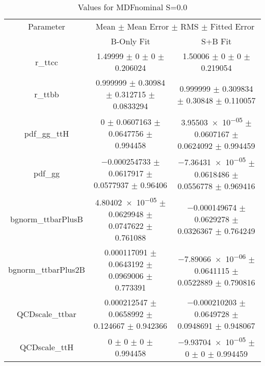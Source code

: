 \begin{table}
\centering
\caption{Values for MDFnominal S=0.0}
\begin{tabular}{ccc}
\toprule
Parameter & \multicolumn{2}{c}{Mean $\pm$ Mean Error $\pm$ RMS $\pm$ Fitted Error}\\
 & B-Only Fit & S+B Fit\\
\midrule
r\_ttcc & \num{1.49999} $\pm$ \num{0} $\pm$ \num{0} $\pm$ \num{0.206024} & \num{1.50006} $\pm$ \num{0} $\pm$ \num{0} $\pm$ \num{0.219054}\\
r\_ttbb & \num{0.999999} $\pm$ \num{0.30984} $\pm$ \num{0.312715} $\pm$ \num{0.0833294} & \num{0.999999} $\pm$ \num{0.309834} $\pm$ \num{0.30848} $\pm$ \num{0.110057}\\
pdf\_gg\_ttH & \num{0} $\pm$ \num{0.0607163} $\pm$ \num{0.0647756} $\pm$ \num{0.994458} & \num{3.95503e-05} $\pm$ \num{0.0607167} $\pm$ \num{0.0624092} $\pm$ \num{0.994459}\\
pdf\_gg & \num{-0.000254733} $\pm$ \num{0.0617917} $\pm$ \num{0.0577937} $\pm$ \num{0.96406} & \num{-7.36431e-05} $\pm$ \num{0.0618486} $\pm$ \num{0.0556778} $\pm$ \num{0.969416}\\
bgnorm\_ttbarPlusB & \num{4.80402e-05} $\pm$ \num{0.0629948} $\pm$ \num{0.0747622} $\pm$ \num{0.761088} & \num{-0.000149674} $\pm$ \num{0.0629278} $\pm$ \num{0.0326367} $\pm$ \num{0.764249}\\
bgnorm\_ttbarPlus2B & \num{0.000117091} $\pm$ \num{0.0643192} $\pm$ \num{0.0969006} $\pm$ \num{0.773391} & \num{-7.89066e-06} $\pm$ \num{0.0641115} $\pm$ \num{0.0522889} $\pm$ \num{0.790816}\\
QCDscale\_ttbar & \num{0.000212547} $\pm$ \num{0.0658992} $\pm$ \num{0.124667} $\pm$ \num{0.942366} & \num{-0.000210203} $\pm$ \num{0.0649728} $\pm$ \num{0.0948691} $\pm$ \num{0.948067}\\
QCDscale\_ttH & \num{0} $\pm$ \num{0} $\pm$ \num{0} $\pm$ \num{0.994458} & \num{-9.93704e-05} $\pm$ \num{0} $\pm$ \num{0} $\pm$ \num{0.994459}\\
\bottomrule
\end{tabular}
\end{table}